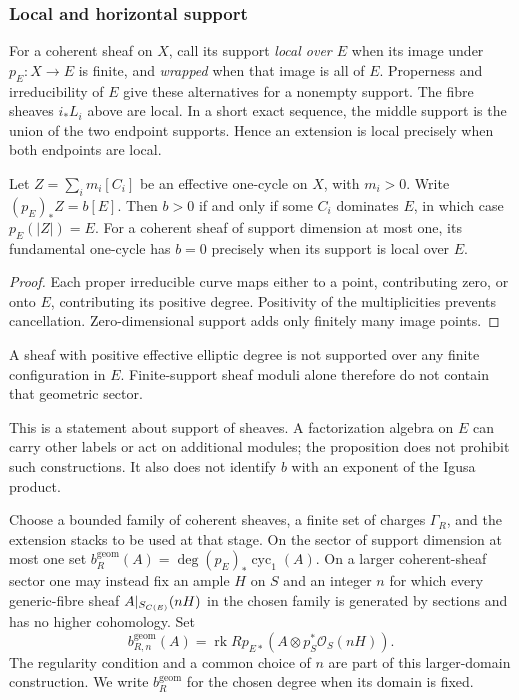 \subsubsection*{Local and horizontal support}

For a coherent sheaf on $X$, call its support \emph{local over $E$}
when its image under $p_E:X\to E$ is finite, and \emph{wrapped}
when that image is all of $E$. Properness and irreducibility of $E$
give these alternatives for a nonempty support. The fibre sheaves
$i_*L_i$ above are local. In a short exact sequence, the middle
support is the union of the two endpoint supports. Hence an
extension is local precisely when both endpoints are local.

\begin{proposition}
\label{prop:positive-elliptic-degree-projects}
\label{lem:wrapped-projection-obstruction}
Let $Z=\sum_i m_i[C_i]$ be an effective one-cycle on $X$, with
$m_i>0$. Write $(p_E)_*Z=b[E]$. Then $b>0$ if and only if some
$C_i$ dominates $E$, in which case $p_E(|Z|)=E$.
For a coherent sheaf of support dimension at most one, its
fundamental one-cycle has $b=0$ precisely when its support is local
over $E$.
\end{proposition}

\begin{proof}
Each proper irreducible curve maps either to a point, contributing
zero, or onto $E$, contributing its positive degree. Positivity of
the multiplicities prevents cancellation. Zero-dimensional support
adds only finitely many image points.
\end{proof}

\begin{corollary}
\label{cor:finite-support-ranE-misses-s}
A sheaf with positive effective elliptic degree is not supported
over any finite configuration in $E$. Finite-support sheaf moduli
alone therefore do not contain that geometric sector.
\end{corollary}

This is a statement about support of sheaves. A factorization
algebra on $E$ can carry other labels or act on additional modules;
the proposition does not prohibit such constructions. It also does
not identify $b$ with an exponent of the Igusa product.

\begin{definition}
\label{def:geometric-elliptic-degree-map}
Choose a bounded family of coherent sheaves, a finite set of charges
$\Gamma_R$, and the extension stacks to be used at that stage.
On the sector of support dimension at most one set
$b_R^{\mathrm{geom}}(A)=\deg(p_E)_*\operatorname{cyc}_1(A)$.
On a larger coherent-sheaf sector one may instead fix an ample $H$
on $S$ and an integer $n$ for which every generic-fibre sheaf
$A|_{S_{C(E)}}(nH)$ in the chosen family is generated by sections
and has no higher cohomology. Set
\[
 b_{R,n}^{\mathrm{geom}}(A)
 =\operatorname{rk}Rp_{E*}(A\otimes p_S^*\mathcal O_S(nH)).
\]
The regularity condition and a common choice of $n$ are part of this
larger-domain construction. We write $b_R^{\mathrm{geom}}$ for the
chosen degree when its domain is fixed.
\end{definition}

